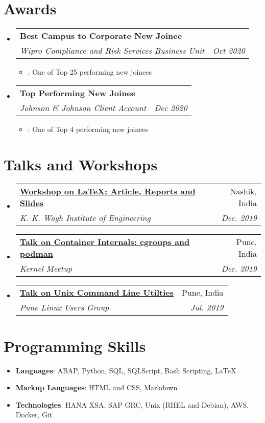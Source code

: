 \documentclass[a4,11pt]{article}
\makeatletter
\newcommand{\resumeItem}[2]{
  \item\small{
    \textbf{#1}{: #2 \vspace{-2pt}}
  }
}
\newcommand{\resumeSubheading}[4]{
  \vspace{-1pt}\item
    \begin{tabular*}{0.97\textwidth}[t]{l@{\extracolsep{\fill}}r}
      \textbf{#1} & #2 \\
      \textit{\small#3} & \textit{\small #4} \\
    \end{tabular*}\vspace{-5pt}
}
\newcommand{\resumeSubHeadingListStart}{\begin{itemize}[leftmargin=*]}
\newcommand{\resumeSubHeadingListEnd}{\end{itemize}}
\newcommand{\resumeItemListStart}{\begin{itemize}}
\newcommand{\resumeItemListEnd}{\end{itemize}\vspace{-5pt}}
\makeatother
\begin{document}
\section{Awards}
  \resumeSubHeadingListStart
	  	\resumeSubheading
	  	  {Best Campus to Corporate New Joinee}{}
		  {Wipro Compliance and Risk Services Business Unit}{Oct 2020}
		  \resumeItemListStart
			  \resumeItem{}{One of Top 25 performing new joinees}
		  \resumeItemListEnd
	  	\resumeSubheading
	  	  {Top Performing New Joinee}{}
		  {Johnson \& Johnson Client Account}{Dec 2020}
		  \resumeItemListStart
			  \resumeItem{}{One of Top 4 performing new joinees}
		  \resumeItemListEnd
  \resumeSubHeadingListEnd

\section{Talks and Workshops}
	\resumeSubHeadingListStart
	  	\resumeSubheading
		{\href{https://github.com/whereistejas/latex-workshop}{Workshop on LaTeX: Article, Reports and Slides}}{Nashik, India}
		  {K. K. Wagh Institute of Engineering}{Dec. 2019}
	  	\resumeSubheading
		{\href{https://github.com/whereistejas/plug-containers-talk}{Talk on Container Internals: cgroups and podman}}{Pune, India}
		  {Kernel Meetup}{Dec. 2019}
	  	\resumeSubheading
		{\href{https://github.com/whereistejas/plug-command-line}{Talk on Unix Command Line Utilties}}{Pune, India}
		  {Pune Linux Users Group}{Jul. 2019}
	\resumeSubHeadingListEnd

\section{Programming Skills}
	\resumeSubHeadingListStart
		\item{\textbf{Languages}{: ABAP, Python, SQL, SQLScript, Bash Scripting, LaTeX} }
			\hfill
		\item{\textbf{Markup Languages}{: HTML and CSS, Markdown} }
			\hfill
		\item{\textbf{Technologies}{: HANA XSA, SAP GRC, Unix (RHEL and Debian), AWS, Docker, Git} }
			\hfill
	\resumeSubHeadingListEnd

\end{document}
